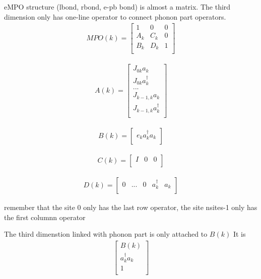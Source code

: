 \documentclass[a4paper,11pt]{ctexart}
\begin{document}
eMPO structure (lbond, rbond, e-pb bond) is almost a matrix.
The third dimension only has one-line operator to connect phonon part operators.
\begin{gather}
MPO(k) = 
\begin{bmatrix}
    1 & 0 & 0  \\
    A_k & C_k & 0  \\
    B_k & D_k & 1  \\
\end{bmatrix}
\end{gather}

\begin{gather}
A(k) = 
\begin{bmatrix}
    J_{0k} a_k  \\
    J_{0k} a^\dagger_k \\
    ...  \\
    J_{k-1,k} a_k  \\
    J_{k-1,k} a^\dagger_k \\
\end{bmatrix}
\end{gather}

\begin{gather}
B(k) = 
\begin{bmatrix}
    e_k a^\dagger_k a_k \\
\end{bmatrix}
\end{gather}

\begin{gather}
C(k) = 
\begin{bmatrix}
    I & 0 & 0 \\ 
\end{bmatrix}
\end{gather}

\begin{gather}
D(k) = 
\begin{bmatrix}
    0 & ... & 0 & a^\dagger_k & a_k  \\ 
\end{bmatrix}
\end{gather}

remember that the site 0 only has the last row operator,
the site nsites-1 only has the first columnn operator

The third dimenstion linked with phonon part is only attached to $B(k)$
It is 
\begin{gather}
\begin{bmatrix}
    B(k)  \\
    a^\dagger_k a_k \\
    1 \\
\end{bmatrix}
\end{gather}
\end{document}
